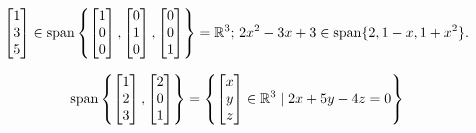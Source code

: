 \begin{example}
	\begin{equation*}
		\begin{bmatrix}
			1 \\ 3 \\ 5
		\end{bmatrix} \in \operatorname{span}{\left\{\begin{bmatrix}
				1 \\ 0 \\ 0
			\end{bmatrix}, \begin{bmatrix}
				0 \\ 1 \\ 0	
			\end{bmatrix}, \begin{bmatrix}
				0 \\ 0 \\ 1
			\end{bmatrix}\right\}}= \mathbb{R}^3 \text{; } 2x^2 - 3x + 3 \in \operatorname{span}\{2,1-x,1+x^2\}.
	\end{equation*}
\end{example}
\begin{example}
	\begin{equation*}
		\operatorname{span}\left\{\begin{bmatrix}
			1 \\ 2 \\ 3
		\end{bmatrix}, \begin{bmatrix}
			2 \\ 0 \\ 1
		\end{bmatrix}\right\} = \left\{\begin{bmatrix}
			x \\ y \\ z
		\end{bmatrix} \in \mathbb{R}^3 \mid 2x + 5y - 4z = 0\right\}
	\end{equation*}
\end{example}
